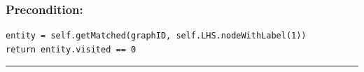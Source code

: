 \documentclass{article}
\begin{document}
\vspace{8pt}
\subsubsection*{Precondition: }
\begin{small}\begin{verbatim}
entity = self.getMatched(graphID, self.LHS.nodeWithLabel(1))
return entity.visited == 0
\end{verbatim}\end{small}

\hrule \vspace{6pt}
\end{document}

